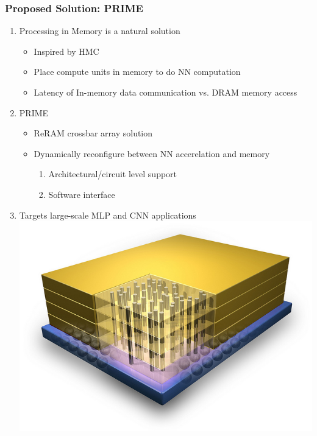 \documentclass[hyperref={colorlinks}]{beamer}
\begin{document}
\begin{frame}
	\frametitle{Proposed Solution: PRIME}
	\begin{enumerate}
		\item Processing in Memory is a natural solution
		\begin{itemize}
			\item Inspired by HMC
			\item Place compute units in memory to do NN computation
			\item Latency of In-memory data communication vs. DRAM memory access
		\end{itemize}
		\item PRIME
		\begin{itemize}
			\item ReRAM crossbar array solution
			\item Dynamically reconfigure between NN accerelation and memory
			\begin{enumerate}
				\item Architectural/circuit level support
				\item Software interface 
			\end{enumerate}
		\end{itemize}
		\item Targets large-scale MLP and CNN applications
		\includegraphics[scale=0.5,right]{hcm.jpg}
	\end{enumerate}
\end{frame}
\end{document}
